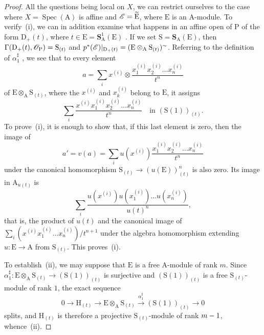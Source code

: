 \begin{proof}
All the questions being local on $X$, we can restrict ourselves to the case where $X=\operatorname{Spec}(\mathrm{A})$ is affine and $\mathscr{E}=\widetilde{\mathrm{E}}$, where $\mathrm{E}$ is an $\mathrm{A}$-module.
To verify~(i), we can in addition examine what happens in an affine open of $\mathrm{P}$ of the form $\mathrm{D}_+(t)$, where $t\in\mathrm{E}=\mathbf{S}_\mathrm{A}^1(\mathrm{E})$ .
If we set $\mathrm{S}=\mathbf{S}_\mathrm{A}(\mathrm{E})$, then
$\Gamma(\mathrm{D}_+(t),\mathscr{O}_{\mathrm{P}})=\mathrm{S}_{(t)}$  and
$p^*(\mathscr{E})|_{\mathrm{D}_+(t)}=(\mathrm{E}\otimes_\mathrm{A}\mathrm{S}_{(t)})^\sim$.
Referring to the definition of $\alpha_1^{\sharp}$ , we see that to every element
\[
  a=\sum_i x^{(i)}\otimes\frac{x_1^{(i)}x_2^{(i)}\ldots x_n^{(i)}}{t^n}
\]
of $\mathrm{E}\otimes_\mathrm{A}\mathrm{S}_{(t)}$, where the $x^{(i)}$ and $x_k^{(i)}$ belong to $\mathrm{E}$, it assigns
\[
  \sum_i\frac{x^{(i)}x_1^{(i)}x_2^{(i)}\ldots x_n^{(i)}}{t^n}
  \quad\text{in }(\mathrm{S}(1))_{(t)}.
\]
To prove~(i), it is enough to show that, if this last element is zero, then the image of
\[
  a'=v(a)=\sum_i u(x^{(i)})\frac{x_1^{(i)}x_2^{(i)}\ldots x_n^{(i)}}{t^n}
\]
under the canonical homomorphism
$\mathrm{S}_{(t)}\to(u(\mathrm{E}))^n_{(t)}$  is also zero.
Its image in $\mathrm{A}_{u(t)}$ is
\[
  \sum_i\frac{u(x^{(i)})u(x_1^{(i)})\ldots u(x_n^{(i)})}{u(t)^n},
\]
that is, the product of $u(t)$ and the canonical image of
$\sum_i(x^{(i)}x_1^{(i)}\ldots x_n^{(i)})/t^{n+1}$ under the algebra homomorphism extending $u:\mathrm{E}\to\mathrm{A}$ from $\mathrm{S}_{(t)}$. This proves~(i).

To establish~(ii), we may suppose that $\mathrm{E}$ is a free $\mathrm{A}$-module of rank $m$. Since $\alpha_1^{\sharp}:\mathrm{E}\otimes_\mathrm{A}\mathrm{S}_{(t)}\to(\mathrm{S}(1))_{(t)}$ is surjective and $(\mathrm{S}(1))_{(t)}$ is a free $\mathrm{S}_{(t)}$-module of rank $1$, the exact sequence
\[
  0\to\mathrm{H}_{(t)}\to\mathrm{E}\otimes_\mathrm{A}\mathrm{S}_{(t)}\xrightarrow{\alpha_1^{\sharp}}(\mathrm{S}(1))_{(t)}\to 0
\]
splits, and $\mathrm{H}_{(t)}$ is therefore a projective $\mathrm{S}_{(t)}$-module of rank $m- 1$, whence~(ii).


\end{proof}
